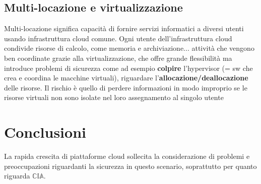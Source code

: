 \subsection{Multi-locazione e virtualizzazione}
Multi-locazione significa capacità di fornire servizi informatici a diversi utenti usando infrastruttura cloud comune. Ogni utente dell'infrastruttura cloud condivide risorse di calcolo, come memoria e archiviazione... attività che vengono ben coordinate grazie alla virtualizzazione, che offre grande flessibilità ma introduce problemi di sicurezza come ad esempio \textbf{colpire} l'hypervisor (= sw che crea e coordina le macchine virtuali), riguardare l'\textbf{allocazione/deallocazione} delle risorse. Il rischio è quello di perdere informazioni in modo improprio se le risorse virtuali non sono isolate nel loro assegnamento al singolo utente 
\section{Conclusioni}
La rapida crescita di piattaforme cloud sollecita la considerazione di problemi e preoccupazioni riguardanti la sicurezza in questo scenario, soprattutto per quanto riguarda $\mathbb{CIA}$.
